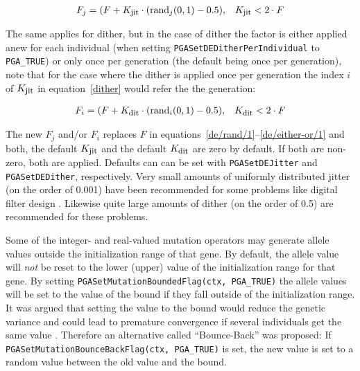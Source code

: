 \documentclass{report}
\begin{document}
\def\jit{K_{\mbox{\footnotesize jit}}}
\def\dit{K_{\mbox{\footnotesize dit}}}
\begin{equation}\label{jitter}
\begin{array}{ll}
F_j = (F + \jit\cdot (\mbox{rand}_j(0, 1) - 0.5), & \jit < 2 \cdot F \\
\end{array}
\end{equation}

The same applies for dither, but in the case of dither the factor is
either applied anew for each individual (when setting
\verb+PGASetDEDitherPerIndividual+ to \verb+PGA_TRUE+) or only once per
generation (the default being once per generation), note that for the
case where the dither is applied once per generation the index $i$ of
$\jit{}$ in equation~\ref{dither} would refer the the generation:

\begin{equation}\label{dither}
\begin{array}{ll}
F_i = (F + \dit\cdot (\mbox{rand}_i(0, 1) - 0.5), & \dit < 2 \cdot F \\
\end{array}
\end{equation}

The new $F_j$ and/or $F_i$ replaces $F$ in
equations~\ref{de/rand/1}--\ref{de/either-or/1} and both, the default
$\jit$ and the default $\dit$ are zero by default.
If both are non-zero, both are applied. Defaults can
can be set with \verb+PGASetDEJitter+ and \verb+PGASetDEDither+,
respectively.
Very small amounts of uniformly distributed jitter (on the order of
0.001) have been recommended for some problems \cite[p.~90]{PSL05} like
digital filter design \cite[p.~440]{PSL05}. Likewise quite large amounts
of dither (on the order of 0.5) are recommended for these problems.

Some of the integer- and real-valued mutation operators may generate allele
values outside the initialization range of that gene.  By
default, the allele value will \textit{not} be reset to the lower
(upper) value of the
initialization range for that gene.  By setting
\verb+PGASetMutationBoundedFlag(ctx, PGA_TRUE)+ the allele values will
be set to the value of the bound if they fall outside of the
initialization range. It was argued that setting the value to the bound
would reduce the genetic variance and could lead to premature
convergence if several individuals get the same value \cite[p.~204]{PSL05}.
Therefore an alternative called ``Bounce-Back'' was proposed: If
\verb+PGASetMutationBounceBackFlag(ctx, PGA_TRUE)+ is set, the new value
is set to a random value between the old value and the bound.
\end{document}
